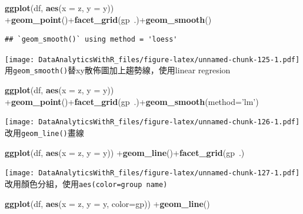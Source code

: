 \documentclass[]{book}
\newenvironment{Shaded}{\begin{snugshade}}{\end{snugshade}}
\newcommand{\KeywordTok}[1]{\textcolor[rgb]{0.13,0.29,0.53}{\textbf{{#1}}}}
\newcommand{\DataTypeTok}[1]{\textcolor[rgb]{0.13,0.29,0.53}{{#1}}}
\newcommand{\StringTok}[1]{\textcolor[rgb]{0.31,0.60,0.02}{{#1}}}
\newcommand{\NormalTok}[1]{{#1}}
\theoremstyle{definition}
\theoremstyle{definition}
\theoremstyle{remark}
\begin{document}
\begin{Shaded}
\begin{Highlighting}[]
\KeywordTok{ggplot}\NormalTok{(df, }\KeywordTok{aes}\NormalTok{(}\DataTypeTok{x =} \NormalTok{z, }\DataTypeTok{y =} \NormalTok{y)) +}\KeywordTok{geom_point}\NormalTok{()+}\KeywordTok{facet_grid}\NormalTok{(gp~.)+}\KeywordTok{geom_smooth}\NormalTok{()}
\end{Highlighting}
\end{Shaded}

\begin{verbatim}
## `geom_smooth()` using method = 'loess'
\end{verbatim}

\texttt{[image: DataAnalyticsWithR\_files/figure-latex/unnamed-chunk-125-1.pdf]}
用\texttt{geom\_smooth()}替xy散佈圖加上趨勢線，使用linear regresion

\begin{Shaded}
\begin{Highlighting}[]
\KeywordTok{ggplot}\NormalTok{(df, }\KeywordTok{aes}\NormalTok{(}\DataTypeTok{x =} \NormalTok{z, }\DataTypeTok{y =} \NormalTok{y)) +}\KeywordTok{geom_point}\NormalTok{()+}\KeywordTok{facet_grid}\NormalTok{(gp~.)+}\KeywordTok{geom_smooth}\NormalTok{(}\DataTypeTok{method=}\StringTok{'lm'}\NormalTok{)}
\end{Highlighting}
\end{Shaded}

\texttt{[image: DataAnalyticsWithR\_files/figure-latex/unnamed-chunk-126-1.pdf]}
改用\texttt{geom\_line()}畫線

\begin{Shaded}
\begin{Highlighting}[]
\KeywordTok{ggplot}\NormalTok{(df, }\KeywordTok{aes}\NormalTok{(}\DataTypeTok{x =} \NormalTok{z, }\DataTypeTok{y =} \NormalTok{y)) +}\KeywordTok{geom_line}\NormalTok{()+}\KeywordTok{facet_grid}\NormalTok{(gp~.)}
\end{Highlighting}
\end{Shaded}

\texttt{[image: DataAnalyticsWithR\_files/figure-latex/unnamed-chunk-127-1.pdf]}
改用顏色分組，使用\texttt{aes(color=\textquotesingle{}group\ name\textquotesingle{})}

\begin{Shaded}
\begin{Highlighting}[]
\KeywordTok{ggplot}\NormalTok{(df, }\KeywordTok{aes}\NormalTok{(}\DataTypeTok{x =} \NormalTok{z, }\DataTypeTok{y =} \NormalTok{y, }\DataTypeTok{color=}\NormalTok{gp)) +}\KeywordTok{geom_line}\NormalTok{()}
\end{Highlighting}
\end{Shaded}
\end{document}
